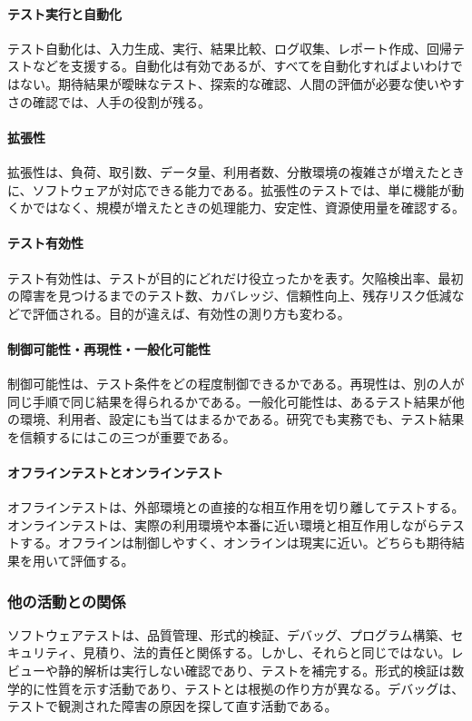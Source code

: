 \documentclass[a4paper,11pt]{ltjsarticle}
\numberwithin{figure}{section}
\numberwithin{table}{section}
\begin{document}
\paragraph{テスト実行と自動化}
テスト自動化は、入力生成、実行、結果比較、ログ収集、レポート作成、回帰テストなどを支援する。自動化は有効であるが、すべてを自動化すればよいわけではない。期待結果が曖昧なテスト、探索的な確認、人間の評価が必要な使いやすさの確認では、人手の役割が残る。

\paragraph{拡張性}
拡張性は、負荷、取引数、データ量、利用者数、分散環境の複雑さが増えたときに、ソフトウェアが対応できる能力である。拡張性のテストでは、単に機能が動くかではなく、規模が増えたときの処理能力、安定性、資源使用量を確認する。

\paragraph{テスト有効性}
テスト有効性は、テストが目的にどれだけ役立ったかを表す。欠陥検出率、最初の障害を見つけるまでのテスト数、カバレッジ、信頼性向上、残存リスク低減などで評価される。目的が違えば、有効性の測り方も変わる。

\paragraph{制御可能性・再現性・一般化可能性}
制御可能性は、テスト条件をどの程度制御できるかである。再現性は、別の人が同じ手順で同じ結果を得られるかである。一般化可能性は、あるテスト結果が他の環境、利用者、設定にも当てはまるかである。研究でも実務でも、テスト結果を信頼するにはこの三つが重要である。

\paragraph{オフラインテストとオンラインテスト}
オフラインテストは、外部環境との直接的な相互作用を切り離してテストする。オンラインテストは、実際の利用環境や本番に近い環境と相互作用しながらテストする。オフラインは制御しやすく、オンラインは現実に近い。どちらも期待結果を用いて評価する。

\subsubsection{他の活動との関係}
ソフトウェアテストは、品質管理、形式的検証、デバッグ、プログラム構築、セキュリティ、見積り、法的責任と関係する。しかし、それらと同じではない。レビューや静的解析は実行しない確認であり、テストを補完する。形式的検証は数学的に性質を示す活動であり、テストとは根拠の作り方が異なる。デバッグは、テストで観測された障害の原因を探して直す活動である。
\end{document}
